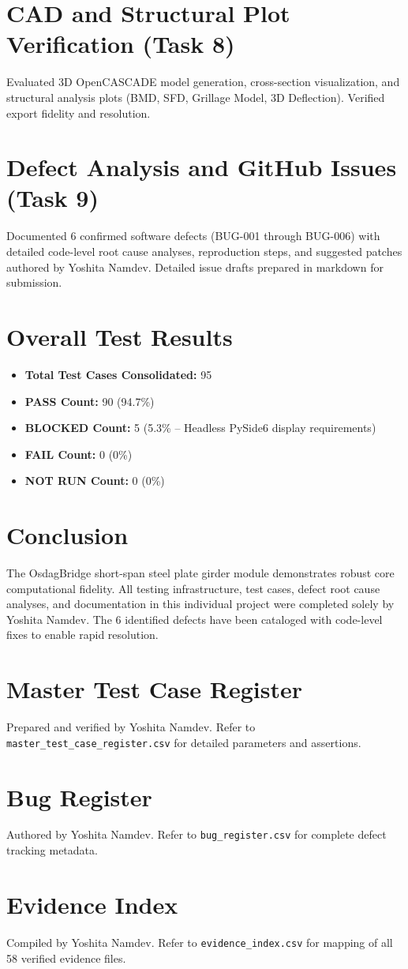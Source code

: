 \documentclass[11pt,a4paper]{report}
\begin{document}
\chapter{CAD and Structural Plot Verification (Task 8)}
Evaluated 3D OpenCASCADE model generation, cross-section visualization, and structural analysis plots (BMD, SFD, Grillage Model, 3D Deflection). Verified export fidelity and resolution.

\chapter{Defect Analysis and GitHub Issues (Task 9)}
Documented 6 confirmed software defects (BUG-001 through BUG-006) with detailed code-level root cause analyses, reproduction steps, and suggested patches authored by Yoshita Namdev. Detailed issue drafts prepared in markdown for submission.

\chapter{Overall Test Results}
\begin{itemize}
    \item \textbf{Total Test Cases Consolidated:} 95
    \item \textbf{PASS Count:} 90 (94.7\%)
    \item \textbf{BLOCKED Count:} 5 (5.3\% -- Headless PySide6 display requirements)
    \item \textbf{FAIL Count:} 0 (0\%)
    \item \textbf{NOT RUN Count:} 0 (0\%)
\end{itemize}

\chapter{Conclusion}
The OsdagBridge short-span steel plate girder module demonstrates robust core computational fidelity. All testing infrastructure, test cases, defect root cause analyses, and documentation in this individual project were completed solely by Yoshita Namdev. The 6 identified defects have been cataloged with code-level fixes to enable rapid resolution.

\appendix
\chapter{Master Test Case Register}
Prepared and verified by Yoshita Namdev. Refer to \texttt{master\_test_case_register.csv} for detailed parameters and assertions.

\chapter{Bug Register}
Authored by Yoshita Namdev. Refer to \texttt{bug_register.csv} for complete defect tracking metadata.

\chapter{Evidence Index}
Compiled by Yoshita Namdev. Refer to \texttt{evidence_index.csv} for mapping of all 58 verified evidence files.
\end{document}
